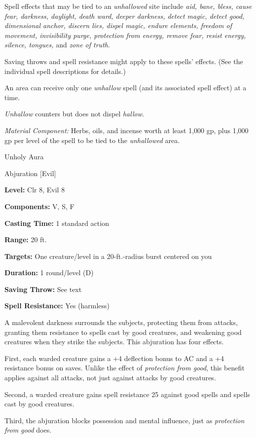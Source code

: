 \documentclass{article}
\begin{document}
Spell effects that may be tied to an \textit{unhallowed }site include \textit{aid, 
bane, bless, cause fear, darkness, daylight, death ward, deeper darkness, detect 
magic, detect good, dimensional anchor, discern lies, dispel magic, endure elements, 
freedom of movement, invisibility purge, protection from energy, remove fear, resist 
energy, silence, tongues, }and \textit{zone of truth}.

Saving throws and spell resistance might apply to these spells' effects. (See the 
individual spell descriptions for details.)

An area can receive only one \textit{unhallow }spell (and its associated spell 
effect) at a time.

\textit{Unhallow }counters but does not dispel \textit{hallow}.

\textit{Material Component: }Herbs, oils, and incense worth at least 1,000 gp, 
plus 1,000 gp per level of the spell to be tied to the \textit{unhallowed }area.

\vspace{12pt}
Unholy Aura

Abjuration [Evil]

\textbf{Level:} Clr 8, Evil 8

\textbf{Components:} V, S, F

\textbf{Casting Time:} 1 standard action

\textbf{Range:} 20 ft.

\textbf{Targets:} One creature/level in a 20-ft.-radius burst centered on you

\textbf{Duration:} 1 round/level (D)

\textbf{Saving Throw:} See text

\textbf{Spell Resistance:} Yes (harmless)

A malevolent darkness surrounds the subjects, protecting them from attacks, granting 
them resistance to spells cast by good creatures, and weakening good creatures 
when they strike the subjects. This abjuration has four effects.

First, each warded creature gains a +4 deflection bonus to AC and a +4 resistance 
bonus on saves. Unlike the effect of \textit{protection from good}, this benefit 
applies against all attacks, not just against attacks by good creatures.

Second, a warded creature gains spell resistance 25 against good spells and spells 
cast by good creatures.

Third, the abjuration blocks possession and mental influence, just as \textit{protection 
from good }does.
\end{document}
